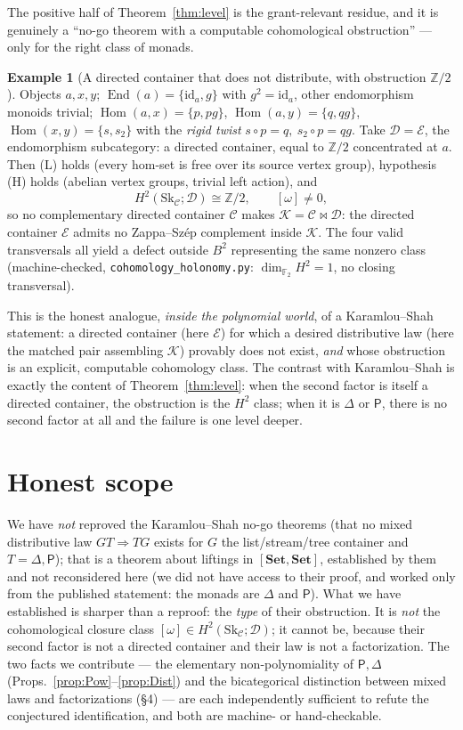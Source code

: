 \documentclass[11pt]{article}
\theoremstyle{definition}
\newtheorem{example}[theorem]{Example}
\newcommand{\Hom}{\operatorname{Hom}}
\newcommand{\End}{\operatorname{End}}
\newcommand{\id}{\mathrm{id}}
\newcommand{\C}{\mathcal{C}}
\newcommand{\D}{\mathcal{D}}
\newcommand{\K}{\mathcal{K}}
\newcommand{\E}{\mathcal{E}}
\newcommand{\Set}{\mathbf{Set}}
\newcommand{\Sk}{\mathrm{Sk}}
\newcommand{\Pow}{\mathsf{P}}
\newcommand{\Dist}{\Delta}
\begin{document}
The positive half of Theorem~\ref{thm:level} is the grant-relevant residue, and it
is genuinely a ``no-go theorem with a computable cohomological obstruction'' --- only
for the right class of monads.

\begin{example}[A directed container that does not distribute, with obstruction
$\mathbb Z/2$]\label{ex:rt}
Objects $a,x,y$; $\End(a)=\{\id_a,g\}$ with $g^2=\id_a$, other endomorphism monoids
trivial; $\Hom(a,x)=\{p,pg\}$, $\Hom(a,y)=\{q,qg\}$, $\Hom(x,y)=\{s,s_2\}$ with the
\emph{rigid twist} $s\circ p=q,\ s_2\circ p=qg$. Take $\D=\E$, the endomorphism
subcategory: a directed container, equal to $\mathbb Z/2$ concentrated at $a$. Then
\textnormal{(L)} holds (every hom-set is free over its source vertex group),
hypothesis \textnormal{(H)} holds (abelian vertex groups, trivial left action), and
\[
   H^2(\Sk_\C;\D)\cong\mathbb Z/2,\qquad [\omega]\neq0,
\]
so no complementary directed container $\C$ makes $\K=\C\bowtie\D$: the directed
container $\E$ admits no Zappa--Sz\'ep complement inside $\K$. The four valid
transversals all yield a defect outside $B^2$ representing the same nonzero class
(machine-checked, \texttt{cohomology\_holonomy.py}: $\dim_{\mathbb F_2}H^2=1$, no
closing transversal).
\end{example}

This is the honest analogue, \emph{inside the polynomial world}, of a
Karamlou--Shah statement: a directed container (here $\E$) for which a desired
distributive law (here the matched pair assembling $\K$) provably does not exist,
\emph{and} whose obstruction is an explicit, computable cohomology class. The
contrast with Karamlou--Shah is exactly the content of Theorem~\ref{thm:level}: when
the second factor is itself a directed container, the obstruction is the $H^2$ class;
when it is $\Dist$ or $\Pow$, there is no second factor at all and the failure is one
level deeper.

\section{Honest scope}

We have \emph{not} reproved the Karamlou--Shah no-go theorems (that no mixed
distributive law $GT\Rightarrow TG$ exists for $G$ the list/stream/tree container
and $T=\Dist,\Pow$); that is a theorem about liftings in $[\Set,\Set]$, established
by them and not reconsidered here (we did not have access to their proof, and worked
only from the published statement: the monads are $\Dist$ and $\Pow$). What we have
established is sharper than a reproof: the \emph{type} of their obstruction. It is
\emph{not} the cohomological closure class $[\omega]\in H^2(\Sk_\C;\D)$; it cannot
be, because their second factor is not a directed container and their law is not a
factorization. The two facts we contribute --- the elementary non-polynomiality of
$\Pow,\Dist$ (Props.~\ref{prop:Pow}--\ref{prop:Dist}) and the bicategorical
distinction between mixed laws and factorizations (\S4) --- are each independently
sufficient to refute the conjectured identification, and both are machine- or
hand-checkable.
\end{document}
